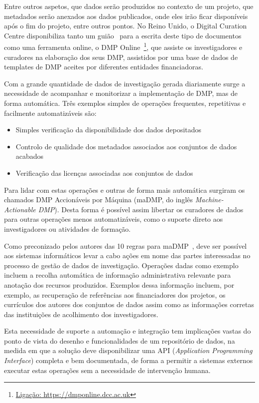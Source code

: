 \documentclass[sigconf,nonacm]{acmart}
\begin{document}
Entre outros aspetos, que dados serão produzidos no contexto de um projeto, que metadados serão anexados aos dados publicados, onde eles irão ficar disponíveis após o fim do projeto, entre outros pontos. No Reino Unido, o Digital Curation Centre disponibiliza tanto um guião~\cite{jones_dmp} para a escrita deste tipo de documentos como uma ferramenta online, o DMP Online~\footnote{\url{Ligação: https://dmponline.dcc.ac.uk}}, que assiste os investigadores e curadores na elaboração dos seus DMP, assistidos por uma base de dados de templates de DMP aceites por diferentes entidades financiadoras.

Com a grande quantidade de dados de investigação gerada diariamente surge a necessidade de acompanhar e monitorizar a implementação de DMP, mas de forma automática. Três exemplos simples de operações frequentes, repetitivas e facilmente automatizáveis são: 

\begin{itemize}
    \item Simples verificação da disponibilidade dos dados depositados
    \item Controlo de qualidade dos metadados associados aos conjuntos de dados acabados
    \item Verificação das licenças associadas aos conjuntos de dados
\end{itemize}

Para lidar com estas operações e outras de forma mais automática surgiram os chamados DMP Accionáveis por Máquina (maDMP, do inglês \textit{Machine-Actionable DMP}). Desta forma é possível assim libertar os curadores de dados para outras operações menos automatizáveis, como o suporte direto aos investigadores ou atividades de formação.

Como preconizado pelos autores das 10 regras para maDMP~\cite{miksa_tomasz_2018_1172673}, deve ser possível aos sistemas informáticos levar a cabo ações em nome das partes interessadas no processo de gestão de dados de investigação. Operações dadas como exemplo incluem a recolha automática de informação administrativa relevante para anotação dos recursos produzidos. Exemplos dessa informação incluem, por exemplo, as recuperação de referências aos financiadores dos projetos, os currículos dos autores dos conjuntos de dados assim como as informações corretas das instituições de acolhimento dos investigadores. 

Esta necessidade de suporte a automação e integração tem implicações vastas do ponto de vista do desenho e funcionalidades de um repositório de dados, na medida em que a solução deve disponibilizar uma API (\textit{Application Programming Interface}) completa e bem documentada, de forma a permitir a sistemas externos executar estas operações sem a necessidade de intervenção humana.
\end{document}
